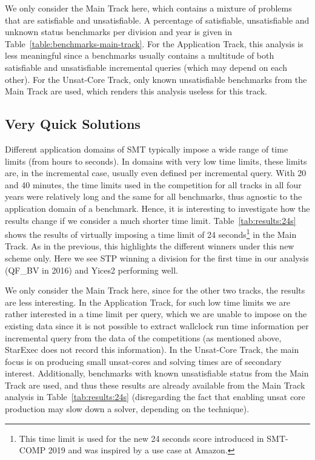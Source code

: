 \documentclass[dvipsnames,table,twoside,11pt]{article}
\newcommand{\maintrack}{Main Track\xspace}
\newcommand{\apptrack}{Application Track\xspace}
\newcommand{\ucoretrack}{Unsat-Core Track\xspace}
\begin{document}
We only consider the \maintrack here, which contains a mixture of problems that
are satisfiable and unsatisfiable. A percentage of satisfiable, unsatisfiable
and unknown status benchmarks per division and year is given in
Table~\ref{table:benchmarks-main-track}.  For the \apptrack, this analysis is
less meaningful since a benchmarks usually contains a multitude of both
satisfiable and unsatisfiable incremental queries
(which may depend on each other).
For the \ucoretrack, only known unsatisfiable benchmarks from the \maintrack
are used, which renders this analysis useless for this track.





\subsection{Very Quick Solutions}

Different application domains of SMT typically impose a wide range of time
limits (from hours to seconds). In domains with very low time limits, these
limits are, in the incremental case, usually even defined per incremental
query.  With 20 and 40 minutes, the time limits used in the competition for all
tracks in all four years were relatively long and the same for all benchmarks,
thus agnostic to the application domain of a benchmark.  Hence, it is
interesting to investigate how the results change if we consider a much shorter
time limit.  Table~\ref{tab:results:24s} shows the results of virtually
imposing a time limit of 24 seconds\footnote{This time limit is used for the
new 24 seconds score introduced in SMT-COMP 2019 and was inspired by a use case
at Amazon.} in the \maintrack.  As in the previous, this highlights the
different winners under this new scheme only. Here we see STP winning a
division for the first time in our analysis (QF\_BV in 2016) and Yices2
performing well.

We only consider the \maintrack here, since for the other two tracks, the
results are less interesting.  In the \apptrack, for such low time limits we
are rather interested in a time limit per query, which we are unable to impose
on the existing data since it is not possible to extract wallclock run time
information per incremental query from the data of the competitions (as
mentioned above, StarExec does not record this information).  In the
\ucoretrack, the main focus is on producing small unsat-cores and solving times
are of secondary interest.  Additionally, benchmarks with known unsatisfiable
status from the \maintrack are used, and thus these results are already
available from the \maintrack analysis in Table~\ref{tab:results:24s}
(disregarding the fact that enabling unsat core production may slow down a
solver, depending on the technique).
\end{document}
